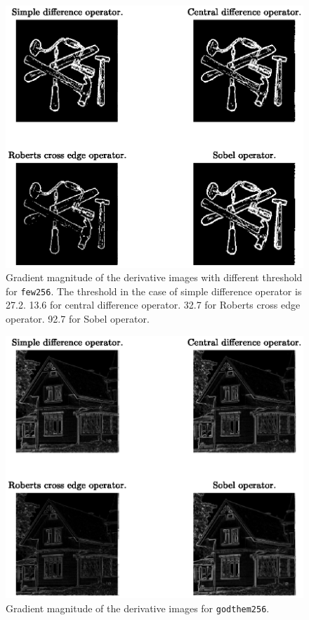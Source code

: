 \documentclass[11pt,a4paper]{article}
\begin{document}
		\begin{figure}[!ht]
		\centering
		\includegraphics[width=0.85\columnwidth]{Question_2_Tools_Threshold.eps}
		\caption{Gradient magnitude of the derivative images with different threshold for \texttt{few256}. The threshold in the case of simple difference operator is 27.2. 13.6 for central difference operator. 32.7 for Roberts cross edge operator. 92.7 for Sobel operator.}
		\label{fig:Question_2_Tools_Threshold}
	\end{figure}
	\begin{figure}[!ht]
		\centering
		\includegraphics[width=0.9\columnwidth]{Question_2_Godthem_Gradient_Magnitude.eps}
		\caption{Gradient magnitude of the derivative images for \texttt{godthem256}.}
		\label{fig:Question_2_Godthem_Gradient_Magnitude}
	\end{figure}
\end{document}
